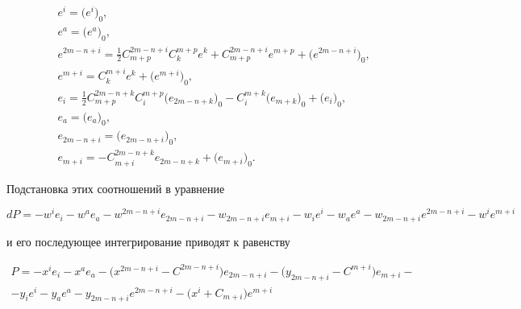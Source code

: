 \begin{align*}


&e^i=\big(e^i\big)_0,\\


%


&e^a=\big(e^a\big)_0,\\


%


&{e^{2m-n+i}=\frac{1}{2}C^{2m-n+i}_{m+p}C^{m+p}_ke^k+ C^{2m-


n+i}_{m+p}e^{m+p}+\big(e^{2m-n+i}\big)_0,}\\


%


&e^{m+i}=C^{m+i}_ke^k+\big(e^{m+i}\big)_0,\\


%


&{e_i=\frac{1}{2}C^{2m-n+k}_{m+p}C^{m+p}_i \big(e_{2m-


n+k}\big)_0-C^{m+k}_i\big(e_{m+k}\big)_0+\big(e_i\big)_0,}\\


%


&e_a=\big(e_a\big)_0,\\


%


&e_{2m-n+i}=\big(e_{2m-n+i}\big)_0,\\


%


&e_{m+i}=-C^{2m-n+k}_{m+i}e_{2m-n+k}+\big(e_{m+i}\big)_0.


\end{align*}


Подстановка этих соотношений в уравнение


$$


dP=-w^ie_i-w^ae_a-w^{2m-n+i}e_{2m-n+i}-w_{2m-n+i}e_{m+i}-w_ie^i-w_ae^a-


w_{2m-n+i}e^{2m-n+i}-w^ie^{m+i}


$$


и его последующее интегрирование приводят к равенству


\begin{multline*}


P=-x^ie_i-x^ae_a-\big(x^{2m-n+i}-C^{2m-n+i}\big)e_{2m-n+i}-


\big(y_{2m-n+i}-C^{m+i}\big)e_{m+i}-\\


-y_ie^i-y_ae^a-y_{2m-n+i}e^{2m-n+i}-\big(x^i+C_{m+i}\big) e^{m+i}


\end{multline*}


